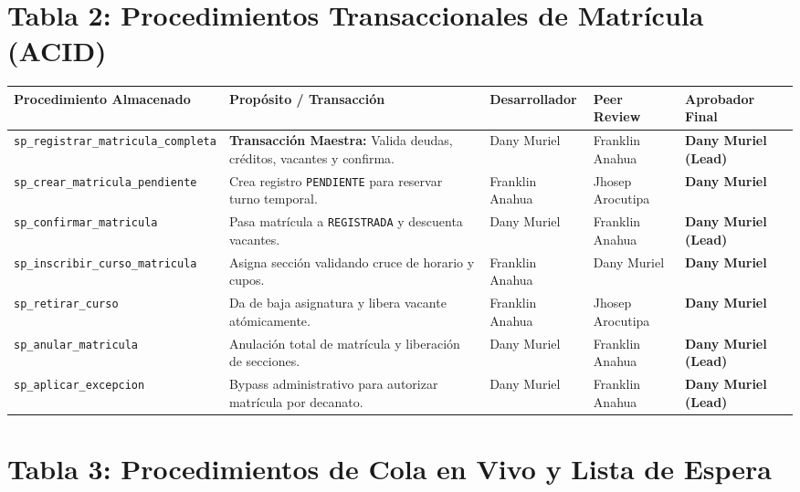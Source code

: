 \documentclass[11pt,a4paper]{article}
\begin{document}
\newpage

\section{Tabla 2: Procedimientos Transaccionales de Matrícula (ACID)}

\begin{longtable}{p{4.5cm} p{3.7cm} p{2.2cm} p{2.4cm} p{2.2cm}}
\toprule
\textbf{Procedimiento Almacenado} & \textbf{Propósito / Transacción} & \textbf{Desarrollador} & \textbf{Peer Review} & \textbf{Aprobador Final} \\
\midrule
\endhead
\texttt{sp\_registrar\_matricula\_completa} & \textbf{Transacción Maestra:} Valida deudas, créditos, vacantes y confirma. & Dany Muriel & Franklin Anahua & \textbf{Dany Muriel (Lead)} \\
\rowcolor{rowgray}
\texttt{sp\_crear\_matricula\_pendiente} & Crea registro \texttt{PENDIENTE} para reservar turno temporal. & Franklin Anahua & Jhosep Arocutipa & \textbf{Dany Muriel} \\
\texttt{sp\_confirmar\_matricula} & Pasa matrícula a \texttt{REGISTRADA} y descuenta vacantes. & Dany Muriel & Franklin Anahua & \textbf{Dany Muriel (Lead)} \\
\rowcolor{rowgray}
\texttt{sp\_inscribir\_curso\_matricula} & Asigna sección validando cruce de horario y cupos. & Franklin Anahua & Dany Muriel & \textbf{Dany Muriel} \\
\texttt{sp\_retirar\_curso} & Da de baja asignatura y libera vacante atómicamente. & Franklin Anahua & Jhosep Arocutipa & \textbf{Dany Muriel} \\
\rowcolor{rowgray}
\texttt{sp\_anular\_matricula} & Anulación total de matrícula y liberación de secciones. & Dany Muriel & Franklin Anahua & \textbf{Dany Muriel (Lead)} \\
\texttt{sp\_aplicar\_excepcion} & Bypass administrativo para autorizar matrícula por decanato. & Dany Muriel & Franklin Anahua & \textbf{Dany Muriel (Lead)} \\
\bottomrule
\end{longtable}

\vspace{0.5cm}

\section{Tabla 3: Procedimientos de Cola en Vivo y Lista de Espera}
\end{document}

